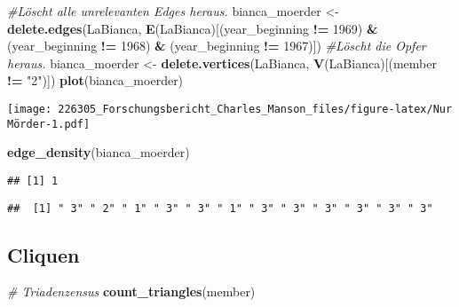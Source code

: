 \documentclass[
]{article}
\newenvironment{Shaded}{\begin{snugshade}}{\end{snugshade}}
\newcommand{\CommentTok}[1]{\textcolor[rgb]{0.56,0.35,0.01}{\textit{#1}}}
\newcommand{\DecValTok}[1]{\textcolor[rgb]{0.00,0.00,0.81}{#1}}
\newcommand{\KeywordTok}[1]{\textcolor[rgb]{0.13,0.29,0.53}{\textbf{#1}}}
\newcommand{\NormalTok}[1]{#1}
\newcommand{\OperatorTok}[1]{\textcolor[rgb]{0.81,0.36,0.00}{\textbf{#1}}}
\newcommand{\StringTok}[1]{\textcolor[rgb]{0.31,0.60,0.02}{#1}}
\begin{document}
\begin{Shaded}
\begin{Highlighting}[]
\CommentTok{#Löscht alle unrelevanten Edges heraus.}
\NormalTok{bianca_moerder <-}
\StringTok{  }\KeywordTok{delete.edges}\NormalTok{(LaBianca, }\KeywordTok{E}\NormalTok{(LaBianca)[(year_beginning }\OperatorTok{!=}\StringTok{ }\DecValTok{1969}\NormalTok{) }\OperatorTok{&}
\StringTok{                                       }\NormalTok{(year_beginning }\OperatorTok{!=}\StringTok{ }\DecValTok{1968}\NormalTok{) }\OperatorTok{&}\StringTok{ }\NormalTok{(year_beginning }\OperatorTok{!=}\StringTok{ }\DecValTok{1967}\NormalTok{)])}
\CommentTok{#Löscht die Opfer heraus.}
\NormalTok{bianca_moerder <-}
\StringTok{  }\KeywordTok{delete.vertices}\NormalTok{(LaBianca, }\KeywordTok{V}\NormalTok{(LaBianca)[(member }\OperatorTok{!=}\StringTok{ "2"}\NormalTok{)])}
\KeywordTok{plot}\NormalTok{(bianca_moerder)}
\end{Highlighting}
\end{Shaded}

\texttt{[image: 226305\_Forschungsbericht\_Charles\_Manson\_files/figure-latex/Nur Mörder-1.pdf]}

\begin{Shaded}
\begin{Highlighting}[]
\KeywordTok{edge_density}\NormalTok{(bianca_moerder)}
\end{Highlighting}
\end{Shaded}

\begin{verbatim}
## [1] 1
\end{verbatim}

\begin{Shaded}
\end{Shaded}

\begin{verbatim}
##  [1] " 3" " 2" " 1" " 3" " 3" " 1" " 3" " 3" " 3" " 3" " 3" " 3"
\end{verbatim}

\hypertarget{cliquen}{%
\subsection{Cliquen}\label{cliquen}}

\begin{Shaded}
\begin{Highlighting}[]
\CommentTok{# Triadenzensus}
\KeywordTok{count_triangles}\NormalTok{(member)}
\end{Highlighting}
\end{Shaded}
\end{document}
